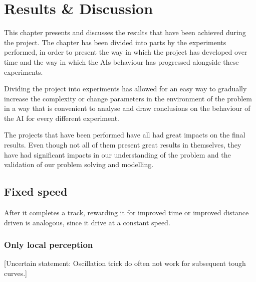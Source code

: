 
\chapter{Results \& Discussion}
This chapter presents and discusses the results that have been achieved during the project. The chapter has been divided into parts by the experiments performed, in order to present the way in which the project has developed over time and the way in which the AIs behaviour has progressed alongside these experiments.

Dividing the project into experiments has allowed for an easy way to gradually increase the complexity or change parameters in the environment of the problem in a way that is convenient to analyse and draw conclusions on the behaviour of the AI for every different experiment.

The projects that have been performed have all had great impacts on the final results. Even though not all of them present great results in themselves, they have had significant impacts in our understanding of the problem and the validation of our problem solving and modelling.






\section{Fixed speed}

After it completes a track, rewarding it for improved time or improved distance driven is analogous, since it drive at a constant speed.


\subsection{Only local perception}
[Uncertain statement: Oscillation trick do often not work for subsequent tough curves.]

